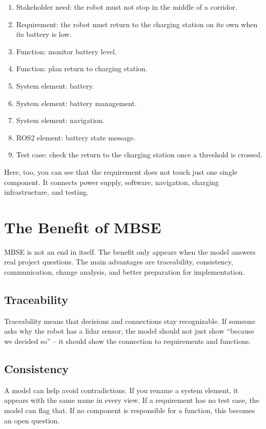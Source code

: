 \begin{enumerate}
    \item Stakeholder need: the robot must not stop in the middle of a corridor.
    \item Requirement: the robot must return to the charging station on its own when its battery is low.
    \item Function: monitor battery level.
    \item Function: plan return to charging station.
    \item System element: battery.
    \item System element: battery management.
    \item System element: navigation.
    \item ROS2 element: battery state message.
    \item Test case: check the return to the charging station once a threshold is crossed.
\end{enumerate}

Here, too, you can see that the requirement does not touch just one single component. It connects power supply, software, navigation, charging infrastructure, and testing.

\section{The Benefit of MBSE}
MBSE is not an end in itself. The benefit only appears when the model answers real project questions. The main advantages are traceability, consistency, communication, change analysis, and better preparation for implementation.

\subsection{Traceability}
Traceability means that decisions and connections stay recognizable. If someone asks why the robot has a lidar sensor, the model should not just show \enquote{because we decided so} -- it should show the connection to requirements and functions.

\subsection{Consistency}
A model can help avoid contradictions. If you rename a system element, it appears with the same name in every view. If a requirement has no test case, the model can flag that. If no component is responsible for a function, this becomes an open question.

